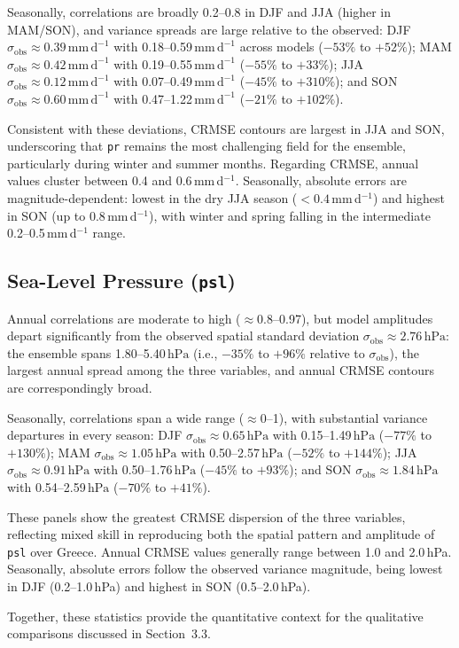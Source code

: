 \documentclass[pdflatex,sn-chicago]{sn-jnl}%
\theoremstyle{thmstyleone}%
\theoremstyle{thmstyletwo}%
\theoremstyle{thmstylethree}%
\begin{document}
\begin{appendices}
Seasonally, correlations are broadly 0.2--0.8 in DJF and JJA (higher in MAM/SON), and variance spreads are large relative to the observed: DJF $\sigma_{\text{obs}} \approx 0.39\,\mathrm{mm\,d^{-1}}$ with 0.18--0.59\,$\mathrm{mm\,d^{-1}}$ across models ($-53\%$ to $+52\%$); MAM $\sigma_{\text{obs}} \approx 0.42\,\mathrm{mm\,d^{-1}}$ with 0.19--0.55\,$\mathrm{mm\,d^{-1}}$ ($-55\%$ to $+33\%$); JJA $\sigma_{\text{obs}} \approx 0.12\,\mathrm{mm\,d^{-1}}$ with 0.07--0.49\,$\mathrm{mm\,d^{-1}}$ ($-45\%$ to $+310\%$); and SON $\sigma_{\text{obs}} \approx 0.60\,\mathrm{mm\,d^{-1}}$ with 0.47--1.22\,$\mathrm{mm\,d^{-1}}$ ($-21\%$ to $+102\%$). 

Consistent with these deviations, CRMSE contours are largest in JJA and SON, underscoring that \texttt{pr} remains the most challenging field for the ensemble, particularly during winter and summer months. Regarding CRMSE, annual values cluster between 0.4 and 0.6\,mm\,d$^{-1}$. Seasonally, absolute errors are magnitude-dependent: lowest in the dry JJA season ($<0.4$\,mm\,d$^{-1}$) and highest in SON (up to 0.8\,mm\,d$^{-1}$), with winter and spring falling in the intermediate 0.2--0.5\,mm\,d$^{-1}$ range.

\subsection*{Sea-Level Pressure (\texttt{psl})}
Annual correlations are moderate to high ($\approx 0.8$--0.97), but model amplitudes depart significantly from the observed spatial standard deviation $\sigma_{\text{obs}} \approx 2.76\,\mathrm{hPa}$: the ensemble spans 1.80--5.40\,$\mathrm{hPa}$ (i.e., $-35\%$ to $+96\%$ relative to $\sigma_{\text{obs}}$), the largest annual spread among the three variables, and annual CRMSE contours are correspondingly broad. 

Seasonally, correlations span a wide range ($\approx 0$--1), with substantial variance departures in every season: DJF $\sigma_{\text{obs}} \approx 0.65\,\mathrm{hPa}$ with 0.15--1.49\,$\mathrm{hPa}$ ($-77\%$ to $+130\%$); MAM $\sigma_{\text{obs}} \approx 1.05\,\mathrm{hPa}$ with 0.50--2.57\,$\mathrm{hPa}$ ($-52\%$ to $+144\%$); JJA $\sigma_{\text{obs}} \approx 0.91\,\mathrm{hPa}$ with 0.50--1.76\,$\mathrm{hPa}$ ($-45\%$ to $+93\%$); and SON $\sigma_{\text{obs}} \approx 1.84\,\mathrm{hPa}$ with 0.54--2.59\,$\mathrm{hPa}$ ($-70\%$ to $+41\%$). 

These panels show the greatest CRMSE dispersion of the three variables, reflecting mixed skill in reproducing both the spatial pattern and amplitude of \texttt{psl} over Greece. Annual CRMSE values generally range between 1.0 and 2.0\,hPa. Seasonally, absolute errors follow the observed variance magnitude, being lowest in DJF (0.2--1.0\,hPa) and highest in SON (0.5--2.0\,hPa).

Together, these statistics provide the quantitative context for the qualitative comparisons discussed in Section~3.3.

\end{appendices}
\end{document}

